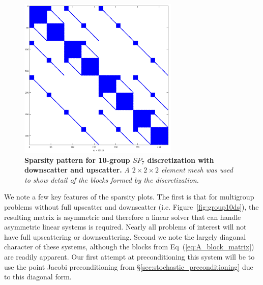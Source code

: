 \begin{figure}[t!]
  \begin{center}
    \includegraphics[width=3in]{chapters/spn_equations/group10us.png}
  \end{center}
  \caption{\textbf{Sparsity pattern for 10-group $SP_7$ discretization
      with downscatter and upscatter.} \textit{A $2\times 2 \times 2$ element
      mesh was used to show detail of the blocks formed by the
      discretization.}}
  \label{fig:group10us}
\end{figure}
We note a few key features of the sparsity plots. The first is that
for multigroup problems without full upscatter and downscatter
(i.e. Figure~\ref{fig:group10ds}), the resulting matrix is asymmetric
and therefore a linear solver that can handle asymmetric linear
systems is required. Nearly all problems of interest will not have
full upscattering or downscattering. Second we note the largely
diagonal character of these systems, although the blocks from
Eq~(\ref{eq:A_block_matrix}) are readily apparent. Our first attempt
at preconditioning this system will be to use the point Jacobi
preconditioning from \S\ref{sec:stochastic_preconditioning} due to
this diagonal form.

